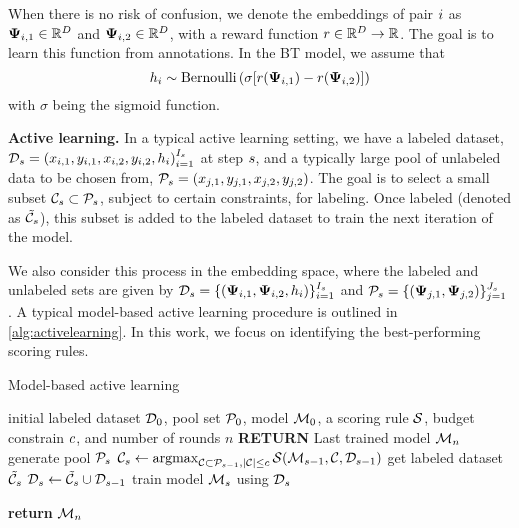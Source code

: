 When there is no risk of confusion, we denote the embeddings of pair $i$ as $\bm{\Psi}_{i,1} \in \mathbb{R}^D$ and $\bm{\Psi}_{i,2}\in \mathbb{R}^D$, with a reward function $r\in \mathbb{R}^D\to \mathbb{R}$. The goal is to learn this function from annotations. In the BT model, we assume that
\begin{equation}
    h_{i}\sim \operatorname{Bernoulli}\left(\sigma[r(\bm{\Psi}_{i,1}) - r(\bm{\Psi}_{i,2})]\right)
\end{equation}
with $\sigma$ being the sigmoid function. 

\textbf{Active learning.} In a typical active learning setting, we have a labeled dataset, $\mathcal{D}_s={(x_{i,1}, y_{i,1}, x_{i,2}, y_{i,2}, h_{i})}_{i=1}^{I_s}$ at step $s$, and a typically large pool of unlabeled data to be chosen from, $\mathcal{P}_s={ (x_{j,1}, y_{j,1}, x_{j,2}, y_{j,2})}$. The goal is to select a small subset $\mathcal{C}_{s} \subset \mathcal{P}_s$, subject to certain constraints, for labeling. Once labeled (denoted as $\tilde{\mathcal{C}}_{s}$), this subset is added to the labeled dataset to train the next iteration of the model.

We also consider this process in the embedding space, where the labeled and unlabeled sets are given by $\mathcal{D}_s=\{(\bm{\Psi}_{i,1}, \bm{\Psi}_{i,2}, h_{i})\}_{i=1}^{I_{s}}$ and $\mathcal{P}_{s}=\{(\bm{\Psi}_{j,1}, \bm{\Psi}_{j,2})\}_{j=1}^{J_{s}}$. A typical model-based active learning procedure is outlined in \cref{alg:activelearning}. In this work, we focus on identifying the best-performing scoring rules.
\begin{algorithm}
\caption{Model-based active learning}
\label{alg:activelearning}
\begin{algorithmic}[1]
\REQUIRE initial labeled dataset $\mathcal{D}_{0}$, pool set $\mathcal{P}_{0}$, model $\mathcal{M}_{0}$, a scoring rule $\mathcal{S}$, budget constrain $c$, and number of rounds $n$
\STATE \textbf{RETURN} Last trained model $\mathcal{M}_{n}$
    \STATE generate pool $\mathcal{P}_{s}$
    \STATE $\mathcal{C}_{s}\gets \operatorname{argmax}_{\mathcal{C}\subset \mathcal{P}_{s-1},|\mathcal{C}|\le c}\mathcal{S}(\mathcal{M}_{s-1}, \mathcal{C}, \mathcal{D}_{s-1})$
    \STATE get labeled dataset $\tilde {\mathcal{C}}_{s}$
    \STATE $\mathcal{D}_{s}\gets \tilde {\mathcal{C}}_{s} \cup \mathcal{D}_{s-1}$
    \STATE train model $\mathcal{M}_{s}$ using $\mathcal{D}_{s}$
\ENDFOR

\STATE \textbf{return} $\mathcal{M}_{n}$
\end{algorithmic}
\end{algorithm}

